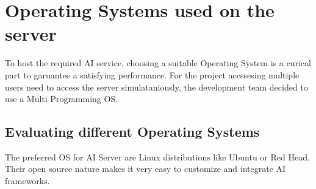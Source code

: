 \cite{TypesOfOs}

\section {Operating Systems used on the server}

To host the required AI service, choosing a suitable Operating System is a curical part to garuantee a satisfying performance.
For the project accssesing multiple users need to access the server simulataniously, the development team decided to use a Multi Programming OS.

\subsection {Evaluating different Operating Systems}

The preferred OS for AI Server are Linux distributions like Ubuntu or Red Head.
Their open source nature makes it very easy to customize and integrate AI frameworks.

\cite{LinuxPoweredAi}



\author{Florian Prandstetter}